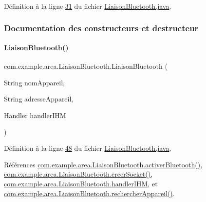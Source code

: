 Définition à la ligne \hyperlink{_liaison_bluetooth_8java_source_l00031}{31} du fichier \hyperlink{_liaison_bluetooth_8java_source}{Liaison\+Bluetooth.\+java}.



\subsubsection{Documentation des constructeurs et destructeur}
\mbox{\label{classcom_1_1example_1_1area_1_1_liaison_bluetooth_a1388dcaf09e2493d2fac6ddb9d8d58e1}} 
\paragraph{\texorpdfstring{Liaison\+Bluetooth()}{LiaisonBluetooth()}}
{\footnotesize\ttfamily com.\+example.\+area.\+Liaison\+Bluetooth.\+Liaison\+Bluetooth (\begin{DoxyParamCaption}\item[{String}]{nom\+Appareil,  }\item[{String}]{adresse\+Appareil,  }\item[{Handler}]{handler\+I\+HM }\end{DoxyParamCaption})}



Définition à la ligne \hyperlink{_liaison_bluetooth_8java_source_l00048}{48} du fichier \hyperlink{_liaison_bluetooth_8java_source}{Liaison\+Bluetooth.\+java}.



Références \hyperlink{_liaison_bluetooth_8java_source_l00067}{com.\+example.\+area.\+Liaison\+Bluetooth.\+activer\+Bluetooth()}, \hyperlink{_liaison_bluetooth_8java_source_l00102}{com.\+example.\+area.\+Liaison\+Bluetooth.\+creer\+Socket()}, \hyperlink{_liaison_bluetooth_8java_source_l00046}{com.\+example.\+area.\+Liaison\+Bluetooth.\+handler\+I\+HM}, et \hyperlink{_liaison_bluetooth_8java_source_l00081}{com.\+example.\+area.\+Liaison\+Bluetooth.\+rechercher\+Appareil()}.


